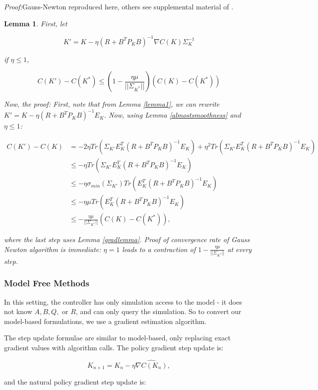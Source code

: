 \documentclass{article}[12pt]
\newtheorem{lemma}{Lemma}
\begin{document}
\textit{Proof:}Gauss-Newton reproduced here, others see supplemental material of \cite{Fazel2018}.

\begin{lemma} First, let

$$K' = K - \eta(R+B^TP_KB)^{-1}\nabla C(K)\Sigma_K^{-1}$$

if $\eta \leq 1$,

$$C(K') - C(K^*) \leq \left(1-\frac{\eta \mu}{||\Sigma_{K^*}||}\right)(C(K)-C(K^*))$$

Now, the proof: 
First, note that from Lemma \ref{lemma1}, we can rewrite $K' = K - \eta(R+B^TP_KB)^{-1}E_K$. Now, using Lemma \ref{almostsmoothness} and $\eta \leq 1$:

\begin{align*}
C(K')- C(K) &= -2\eta Tr(\Sigma_{K'}E_K^T(R+B^TP_KB)^{-1}E_K) + \eta^2Tr(\Sigma_{K'}E_K^T(R+B^TP_KB)^{-1}E_K)\\
&\leq -\eta Tr(\Sigma_{K'}E_K^T(R+B^TP_KB)^{-1}E_K)\\
&\leq -\eta\sigma_{min}(\Sigma_{K'}) Tr(E_K^T(R+B^TP_KB)^{-1}E_K)\\
&\leq -\eta\mu Tr(E_K^T(R+B^TP_KB)^{-1}E_K)\\
&\leq -\frac{\eta \mu}{||\Sigma_{K^*}||}(C(K)-C(K^*)),
\end{align*}

where the last step uses Lemma \ref{gradlemma}. Proof of convergence rate of Gauss Newton algorithm is immediate: $\eta = 1$ leads to a contraction of $1 -\frac{\eta \mu}{||\Sigma_{K^*}||}$ at every step.



\end{lemma}

\subsubsection{Model Free Methods}
In this setting, the controller has only simulation access to the model - it does not know $A, B, Q, $ or $R$, and can only query the simulation. So to convert our model-based formulations, we use a gradient estimation algorithm.

The step update formulae are similar to model-based, only replacing exact gradient values with algorithm calls. The policy gradient step update is:

$$K_{n+1} = K_n -\eta \widehat{\nabla C(K_n)},$$

and the natural policy gradient step update is:
\end{document}
